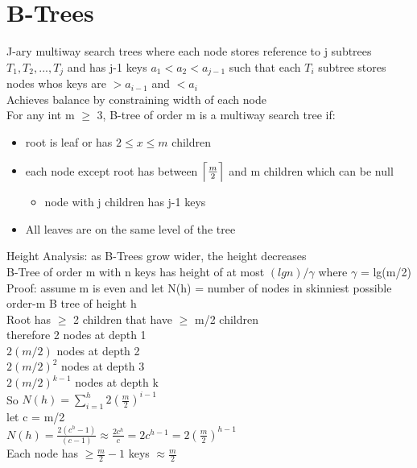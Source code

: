 \documentclass{article}
\DeclarePairedDelimiter{\ceil}{\lceil}{\rceil}
\begin{document}
  \section{B-Trees}
  J-ary multiway search trees where each node stores reference to j subtrees $T_{1}, T_{2}, ..., T_{j}$ and has j-1 keys $a_{1} < a_{2} < a_{j-1}$ such that each $T_{i}$ subtree stores nodes whos keys are $> a_{i-1}$ and $< a_{i}$\\ 
  Achieves balance by constraining width of each node \\
  For any int m $\geq$ 3, B-tree of order m is a multiway search tree if: 
  \begin{itemize}[noitemsep]
  \item root is leaf or has $2 \leq x \leq m$ children
  \item each node except root has between $\ceil[\Big]{\frac{m}{2}}$ and m children which can be null
  \begin{itemize}[noitemsep]
    \item node with j children has j-1 keys
  \end{itemize}
  \item All leaves are on the same level of the tree \\
  \end{itemize}
  Height Analysis: as B-Trees grow wider, the height decreases\\
  B-Tree of order m with n keys has height of at most $(lgn)/\gamma$ where $\gamma$ = lg(m/2)\\
  Proof: assume m is even and let N(h) = number of nodes in skinniest possible order-m B tree of height h\\
  \indent Root has $\geq$ 2 children that have $\geq$ m/2 children \\
  \indent \indent therefore 2 nodes at depth 1\\
  \indent \indent $2(m/2)$ nodes at depth 2\\
  \indent \indent $2(m/2)^{2}$ nodes at depth 3\\
  \indent \indent $2(m/2)^{k-1}$ nodes at depth k\\
  \indent So $N(h) = \sum_{i=1}^{h}2(\frac{m}{2})^{i-1}$\\
  \indent let c = m/2\\
  \indent $N(h) = \frac{2(c^{h}-1)}{(c-1)} \approx \frac{2c^{h}}{c} = 2c^{h-1} = 2(\frac{m}{2})^{h-1}$\\
  \indent Each node has $\geq \frac{m}{2}-1$ keys $\approx \frac{m}{2}$\\
\end{document}
